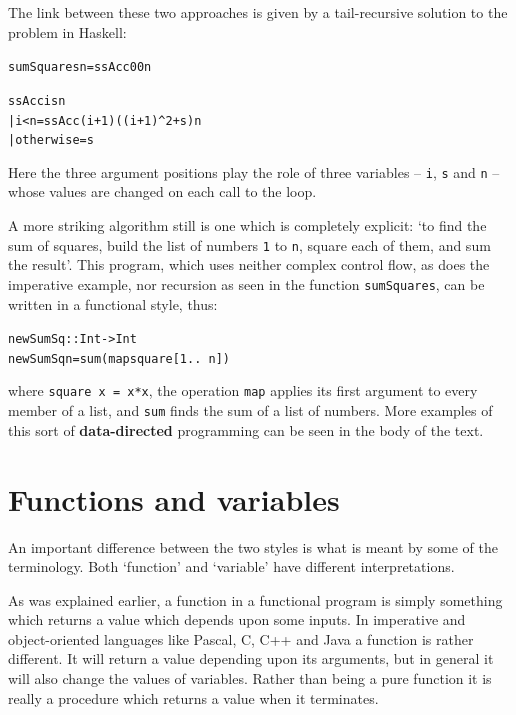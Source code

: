 The link between these two approaches is given by a tail-recursive solution to the problem in Haskell:
\begin{alltt}
sumSquares n = ssAcc 0 0 n

ssAcc i s n
  | i<n       = ssAcc (i+1) ((i+1)^2+s) n
  | otherwise = s
\end{alltt}
Here the three argument positions play the role of three variables -- \texttt{i}, \texttt{s} and \texttt{n} -- whose values are changed on each call to the loop.

A more striking algorithm still is one which is completely explicit:
`to find the sum of squares, build the list of numbers \texttt{1} to 
\texttt{n}, square each of them, and sum the result'.
This program, which uses neither complex control flow, as does the imperative
example, nor recursion as seen in the function \texttt{sumSquares}, can be written
in a functional style, thus:
\begin{alltt}
newSumSq :: Int -> Int
newSumSq n = sum (map square [1 ..\ n])
\end{alltt}
where \texttt{square x = x*x}, the operation \texttt{map}
applies its first argument to every member of a list, and \texttt{sum} finds the
sum of a list of numbers. More examples of this sort of \textbf{data-directed}
programming
can be seen in the body of the text.

\section*{Functions and variables}

An important difference between the two styles
is what is meant by some of the terminology. Both `function' and `variable'
have different interpretations.

As was explained earlier, a function in a functional program is simply
something which returns a value which depends upon some inputs. In 
imperative and object-oriented languages like Pascal, C, C++ and Java a 
function is rather different. It will
return a value depending upon its arguments, but in general it will also 
change the
values of variables. Rather than being a pure function it is really
a procedure which returns a value when it terminates. 

